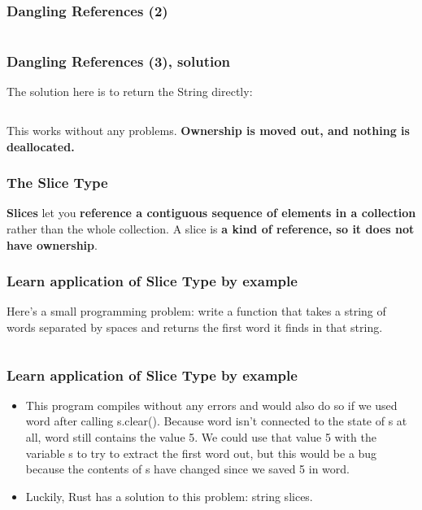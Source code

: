 \documentclass{beamer}
\begin{document}
\begin{frame}[fragile]
	\frametitle{Dangling References (2)}
	
	\inputminted{shell}{./code/dangling.shell}
\end{frame}

\begin{frame}[fragile]
	\frametitle{Dangling References (3), solution}
	The solution here is to return the String directly:
	
	\inputminted{rust}{./code/dangling-sol.rs}
	
	This works without any problems. \textbf{Ownership is moved out, and nothing is deallocated.}
\end{frame}


\begin{frame}[fragile]
	\frametitle{The Slice Type}
	\textbf{Slices} let you \textbf{reference a contiguous sequence of elements in a collection} rather than the whole collection. A slice is \textbf{a kind of reference, so it does not have ownership}.
\end{frame}

\begin{frame}[fragile]
	\frametitle{Learn application of Slice Type by example}
	Here’s a small programming problem: write a function that takes a string of words separated by spaces and returns the first word it finds in that string.
	\scriptsize
	\inputminted[fontsize=\scriptsize]{rust}{./code/slice.rs}
\end{frame}

\begin{frame}[fragile]
	\frametitle{Learn application of Slice Type by example}
\begin{itemize}
	\item This program compiles without any errors and would also do so if we used word after calling s.clear(). Because word isn’t connected to the state of s at all, word still contains the value 5. We could use that value 5 with the variable s to try to extract the first word out, but this would be a bug because the contents of s have changed since we saved 5 in word.
	\item Luckily, Rust has a solution to this problem: string slices.
\end{itemize}
\end{frame}
\end{document}
